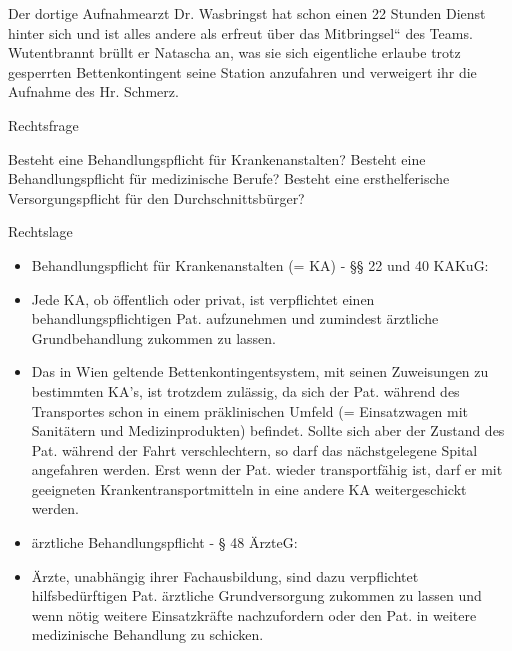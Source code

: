 \documentclass{article}
\begin{document}
Der dortige Aufnahmearzt Dr. Wasbringst hat schon einen 22 Stunden
Dienst hinter sich und ist alles andere als erfreut \"uber das
{\quotedblbase}Mitbringsel{\textquotedblleft} des Teams. Wutentbrannt
br\"ullt er Natascha an, was sie sich eigentliche erlaube trotz
gesperrten Bettenkontingent seine Station anzufahren und verweigert ihr
die Aufnahme des Hr. Schmerz.

Rechtsfrage

Besteht eine Behandlungspflicht f\"ur Krankenanstalten? Besteht eine
Behandlungspflicht f\"ur medizinische Berufe? Besteht eine
ersthelferische Versorgungspflicht f\"ur den Durchschnittsb\"urger?

Rechtslage

\begin{itemize}
\item Behandlungspflicht f\"ur Krankenanstalten (= KA) - {\S}{\S} 22 und
40 KAKuG:

\end{itemize}
\begin{itemize}
\item Jede KA, ob \"offentlich oder privat, ist verpflichtet einen
behandlungspflichtigen Pat.  aufzunehmen und zumindest \"arztliche
Grundbehandlung zukommen zu lassen. 

\item Das in Wien geltende Bettenkontingentsystem, mit seinen
Zuweisungen zu bestimmten KA{\textquoteright}s, ist trotzdem
zul\"assig, da sich der Pat. w\"ahrend des Transportes schon in einem
pr\"aklinischen Umfeld (= Einsatzwagen mit Sanit\"atern und
Medizinprodukten) befindet. Sollte sich aber der Zustand des Pat.
w\"ahrend der Fahrt verschlechtern, so darf das n\"achstgelegene Spital
angefahren werden.  Erst wenn der Pat. wieder transportf\"ahig ist,
darf er mit geeigneten Krankentransportmitteln in eine andere KA
weitergeschickt werden.

\end{itemize}
\begin{itemize}
\item \"arztliche Behandlungspflicht - {\S} 48 \"ArzteG:

\end{itemize}
\begin{itemize}
\item \"Arzte, unabh\"angig ihrer Fachausbildung, sind dazu verpflichtet
hilfsbed\"urftigen Pat. \"arztliche Grundversorgung zukommen zu lassen
und wenn n\"otig weitere Einsatzkr\"afte nachzufordern oder den Pat. in
weitere medizinische Behandlung zu schicken.

\end{itemize}
\end{document}
